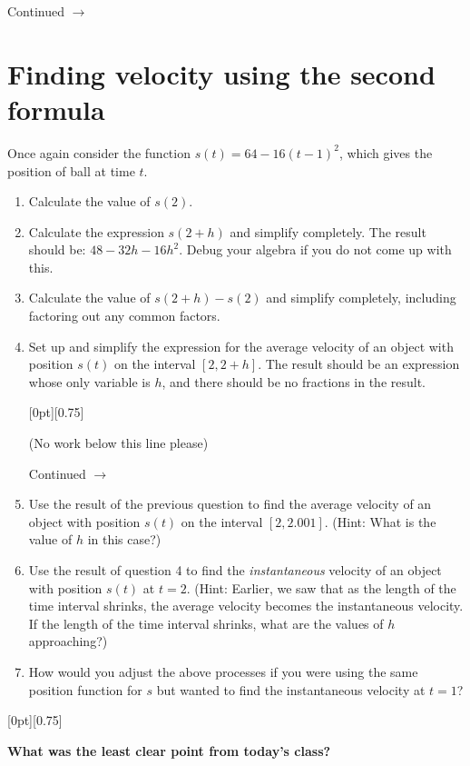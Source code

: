 \documentclass[11pt]{article}
\newcommand{\cuthere}{%
\noindent
\raisebox{-2.8pt}[0pt][0.75\baselineskip]{\small\ding{34}}
\unskip{\tiny\dotfill}
}
\def\ra{\rightarrow}
\def\pageturn{\vfill 
\begin{flushright}
	\begin{small}
		Continued $\ra$
	\end{small}
\end{flushright} \newpage}
\begin{document}
\pageturn	
	
\section{Finding velocity using the second formula}	

Once again consider the function $s(t) = 64 - 16(t-1)^2$, which gives the position of ball at time $t$. 


\begin{enumerate}
	\item Calculate the value of $s(2)$. 
			
	\vspace{0.5in}
			
			\item Calculate the expression $s(2+h)$ and simplify completely. The result should be: $48 - 32h - 16h^2$. Debug your algebra if you do not come up with this.
			
			\vspace{1.3in}
			
			
			\item Calculate the value of $s(2+h) - s(2)$ and simplify completely, including factoring out any common factors. 
			
			\vspace{1.3in}
			
			\item Set up and simplify the expression for the average velocity of an object with position $s(t)$ on the interval $[2, 2+h]$. The result should be an expression whose only variable is $h$, and there should be no fractions in the result. 

			\vfill

			\cuthere
			
			\begin{small}
				(No work below this line please)
			\end{small}
			

\pageturn

			
			\item Use the result of the previous question to find the average velocity of an object with position $s(t)$ on the interval $[2, 2.001]$. (Hint: What is the value of $h$ in this case?)
			
		\vspace{1.2in}
			
			\item Use the result of question 4 to find the \emph{instantaneous} velocity of an object with position $s(t)$ at $t = 2$. (Hint: Earlier, we saw that as the length of the time interval shrinks, the average velocity becomes the instantaneous velocity. If the length of the time interval shrinks, what are the values of $h$ approaching?)
	
		\vspace{2in}
		
		\item How would you adjust the above processes if you were using the same position function for $s$ but wanted to find the instantaneous velocity at $t = 1$? 
	
	
	
\end{enumerate}

\vfill

\cuthere

\noindent
\textbf{What was the least clear point from today's class?}

\vspace{1in}
\end{document}
